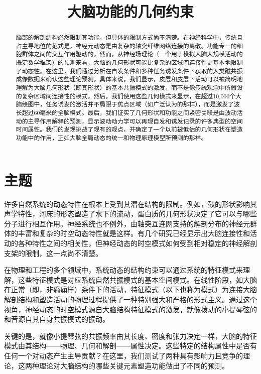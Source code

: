 \documentclass[lang=cn,a4paper,newtx]{elegantpaper}
\title{大脑功能的几何约束}
\date{}
\begin{document}
\maketitle

\begin{abstract}
脑部的解剖结构必然限制其功能，但具体的限制方式尚不清楚。在神经科学中，传统且占主导地位的范式是，神经元动态是由复杂的轴突纤维网络连接的离散、功能专一的细胞群体之间的交互作用驱动的。然而，从神经场理论（一个用于模拟大脑大规模活动的既定数学框架）的预测来看，大脑的几何形状可能比复杂的区域间连接性更基本地限制了动态性。在这里，我们通过分析在自发条件和多种任务诱发条件下获取的人类磁共振成像数据来确认这些理论预测。具体来说，我们显示，皮层和皮层下活动可以被简明地理解为大脑几何形状（即其形状）的基本共振模式的激发，而不是像传统观念中所假设的复杂区域间连接性的模式。然后，我们使用这些几何模式来显示，在超过10,000个大脑绘图中，任务诱发的激活并不局限于焦点区域（如广泛认为的那样），而是激发了波长超过60毫米的全脑模式。最后，我们证实了几何形状和功能之间紧密关联是由波动活动的主导作用解释的预测，显示波动动力学可以再现自发和诱发记录的许多典型的空间时间属性。我们的发现挑战了现有的观点，并确定了一个以前被低估的几何形状在塑造功能中的作用，正如大脑全局动态的统一和物理原理模型所预测的那样。
\end{abstract}

\section{主题}

许多自然系统的动态特性在根本上受到其潜在结构的限制。例如，鼓的形状影响其声学特性，河床的形态塑造了水下的流动，蛋白质的几何形状决定了它可以与哪些分子进行相互作用。神经系统也不例外，由轴突互连网支持的解剖分布的神经元群体的丰富和复杂的时空动态特性就是这样。有几个研究已经显示出大脑连接性和活动的各种特性之间的相关性，但神经动态的时空模式如何受到相对稳定的神经解剖支架的限制，这一点尚不清楚。

在物理和工程的多个领域中，系统动态的结构约束可以通过系统的特征模式来理解，这些特征模式是对应系统自然共振模式的基本空间模式。在线性阶段，如大脑在正常（即，非癫痫样）条件下的活动，特征模式（以下也称为模式）为连接大脑解剖结构和塑造活动的物理过程提供了一种特别强大和严格的形式主义。通过这个视角，神经动态的时空模式源自大脑结构特征模式的激发，就像拨动的小提琴弦的和音源自其自身共振模式的振动。

关键的是，就像小提琴弦的共振频率由其长度、密度和张力决定一样，大脑的特征模式由其结构——物理、几何和解剖——属性决定。这些特定的结构属性中是否有任何一个对动态产生主导贡献？在这里，我们测试了两种具有影响力且竞争的理论，这两种理论对大脑结构的哪些关键元素塑造功能做出了不同的预测。
\end{document}
